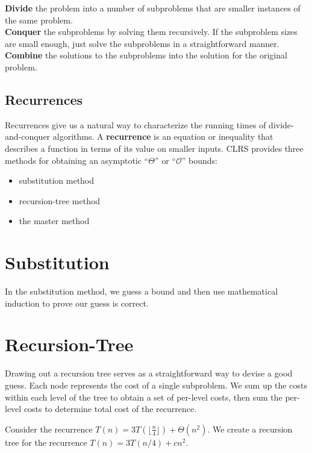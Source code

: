 \documentclass[]{book}
\newlength{\mylen}
\begin{document}
    \noindent\textbf{Divide} the problem into a number of subproblems that are smaller instances of the same problem.\medskip\\
    \textbf{Conquer} the subproblems by solving them recursively. If the subproblem sizes are small enough, just solve the subproblems
    in a straightforward manner.\medskip \\
    \textbf{Combine} the solutions to the subproblems into the solution for the original problem.

      \subsection*{Recurrences}
        Recurrences give us a natural way to characterize the running times of divide-and-conquer algorithms.
        A \textbf{recurrence} is an equation or inequality that describes a function in terms of its value
        on smaller inputs.
        CLRS provides three methods for obtaining an asymptotic ``$\Theta$'' or ``$\mathcal{O}$'' bounds:
        \renewcommand\labelitemi{\raisebox{\mylen}{\tiny$\bullet$}}
        \begin{itemize}
          \item substitution method
          \item recursion-tree method
          \item the master method
        \end{itemize}
    \section{Substitution}
      In the substitution method, we guess a bound and then use mathematical
      induction to prove our guess is correct.

    \section{Recursion-Tree}
      Drawing out a recursion tree serves as a straightforward way to devise
      a good guess. Each node represents the cost of a single subproblem. We
      sum up the costs within each level of the tree to obtain a set of per-level
      costs, then sum the per-level costs to determine total cost of the recurrence.

      Consider the recurrence $T(n) = 3T(\lfloor \frac{n}{4} \rfloor) + \Theta(n^2)$.
      We create a recursion tree for the recurrence $T(n) = 3T(n/4) + cn^2$.
\end{document}
